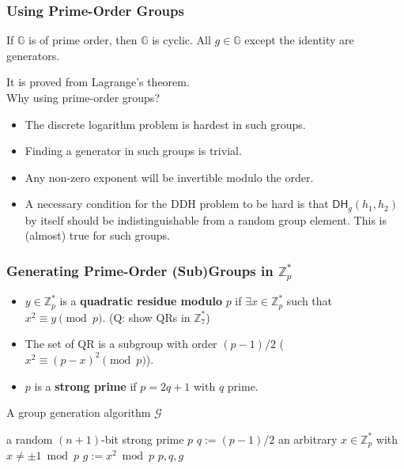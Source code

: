 \begin{frame}\frametitle{Using Prime-Order Groups}
\begin{theorem}
 If $\mathbb{G}$ is of prime order, then $\mathbb{G}$ is cyclic. All $g \in \mathbb{G}$ except the identity are generators.
\end{theorem}
It is proved from Lagrange's theorem.	\newline \\

Why using prime-order groups?
\begin{itemize}
\item The discrete logarithm problem is hardest in such groups.
\item Finding a generator in such groups is trivial.
\item Any non-zero exponent will be invertible modulo the order.
\item A necessary condition for the DDH problem to be hard is that $\mathsf{DH}_g(h_1,h_2)$ by itself should be indistinguishable from a random group element. This is (almost) true for such groups.
\end{itemize}
\end{frame}
\begin{frame}\frametitle{Generating Prime-Order (Sub)Groups in $\mathbb{Z}^*_p$}
\begin{itemize}
\item $y \in \mathbb{Z}^*_p$ is a \textbf{quadratic residue modulo} $p$ if $\exists x \in \mathbb{Z}^*_p$ such that $x^2 \equiv y \pmod p$. \alert{(Q: show QRs in $\mathbb{Z}_{7}^{*}$)} %
\item The set of QR is a subgroup with order $(p-1)/2$ ($x^2 \equiv (p-x)^2 \pmod p$).
\item $p$ is a \textbf{strong prime} if $p=2q+1$ with $q$ prime.
\end{itemize}
\begin{algorithm}[H]
\DontPrintSemicolon
\caption{A group generation algorithm $\mathcal{G}$}
\BlankLine
\KwG a random $(n+1)$-bit strong prime $p$\;
$q := (p-1)/2$\;
\KwC an arbitrary $x \in \mathbb{Z}^*_p$ with $x \neq \pm 1 \bmod p$\;
$g := x^2 \bmod p$\;
\Return $p,q,g$
\end{algorithm}
\end{frame}

